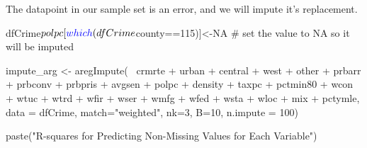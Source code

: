 \documentclass[]{article}
\newenvironment{Shaded}{}{}
\newcommand{\CommentTok}[1]{\textcolor[rgb]{0.00,0.50,0.00}{#1}}
\newcommand{\DataTypeTok}[1]{#1}
\newcommand{\DecValTok}[1]{#1}
\newcommand{\KeywordTok}[1]{\textcolor[rgb]{0.00,0.00,1.00}{#1}}
\newcommand{\NormalTok}[1]{#1}
\newcommand{\OperatorTok}[1]{#1}
\newcommand{\OtherTok}[1]{\textcolor[rgb]{1.00,0.25,0.00}{#1}}
\newcommand{\StringTok}[1]{\textcolor[rgb]{0.00,0.50,0.50}{#1}}
\begin{document}
The datapoint in our sample set is an error, and we will impute it's
replacement.

\begin{Shaded}
\begin{Highlighting}[]
\NormalTok{dfCrime}\OperatorTok{$}\NormalTok{polpc[}\KeywordTok{which}\NormalTok{(dfCrime}\OperatorTok{$}\NormalTok{county}\OperatorTok{==}\DecValTok{115}\NormalTok{)]<-}\OtherTok{NA} \CommentTok{# set the value to NA so it will be imputed}
\end{Highlighting}
\end{Shaded}

\begin{Shaded}
\begin{Highlighting}[]
\NormalTok{impute_arg <-}\StringTok{ }\KeywordTok{aregImpute}\NormalTok{(}\OperatorTok{~}\StringTok{ }\NormalTok{crmrte }\OperatorTok{+}\StringTok{  }\NormalTok{urban }\OperatorTok{+}\StringTok{ }\NormalTok{central }\OperatorTok{+}\StringTok{ }\NormalTok{west }\OperatorTok{+}\StringTok{ }\NormalTok{other }\OperatorTok{+}
\StringTok{                         }\NormalTok{prbarr }\OperatorTok{+}\StringTok{ }\NormalTok{prbconv }\OperatorTok{+}\StringTok{ }\NormalTok{prbpris }\OperatorTok{+}\StringTok{ }\NormalTok{avgsen }\OperatorTok{+}\StringTok{ }\NormalTok{polpc }\OperatorTok{+}
\StringTok{                         }\NormalTok{density }\OperatorTok{+}\StringTok{ }\NormalTok{taxpc }\OperatorTok{+}\StringTok{ }\NormalTok{pctmin80 }\OperatorTok{+}\StringTok{ }\NormalTok{wcon }\OperatorTok{+}\StringTok{ }\NormalTok{wtuc }\OperatorTok{+}
\StringTok{                         }\NormalTok{wtrd }\OperatorTok{+}\StringTok{ }\NormalTok{wfir }\OperatorTok{+}\StringTok{ }\NormalTok{wser }\OperatorTok{+}\StringTok{ }\NormalTok{wmfg }\OperatorTok{+}\StringTok{ }\NormalTok{wfed }\OperatorTok{+}\StringTok{ }\NormalTok{wsta }\OperatorTok{+}\StringTok{ }\NormalTok{wloc }\OperatorTok{+}
\StringTok{                         }\NormalTok{mix }\OperatorTok{+}\StringTok{ }\NormalTok{pctymle, }\DataTypeTok{data =}\NormalTok{ dfCrime, }\DataTypeTok{match=}\StringTok{"weighted"}\NormalTok{,}
                         \DataTypeTok{nk=}\DecValTok{3}\NormalTok{, }\DataTypeTok{B=}\DecValTok{10}\NormalTok{, }\DataTypeTok{n.impute =} \DecValTok{100}\NormalTok{)}
\end{Highlighting}
\end{Shaded}

\begin{Shaded}
\begin{Highlighting}[]
\KeywordTok{paste}\NormalTok{(}\StringTok{"R-squares for Predicting Non-Missing Values for Each Variable"}\NormalTok{)}
\end{Highlighting}
\end{Shaded}
\end{document}
